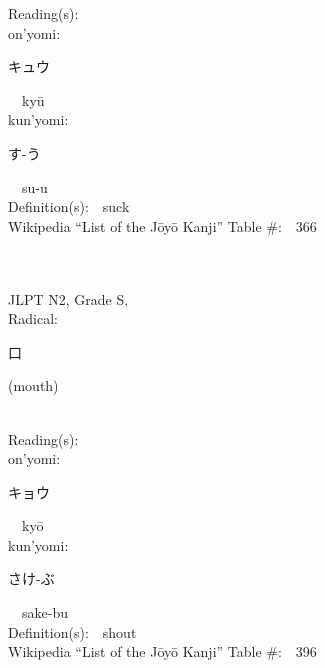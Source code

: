 \begin{multicols}{2}
Reading(s):\ \ \\
{\hspace*{1em}}on'yomi:\ \ \\
{\hspace*{2em}}{\begin{CJK}{UTF8}{min} キュウ \end{CJK}}\ \ ky\=u\ \ \\
{\hspace*{1em}}kun'yomi:\ \ \\
{\hspace*{2em}}{\begin{CJK}{UTF8}{min} す-う \end{CJK}}\ \ su-u\ \ \\
Definition(s):\ \ suck \\
Wikipedia ``List of the J\=oy\=o Kanji'' Table \#:\ \ 366 \\
\ \ \\
{\fontsize{34pt}{40pt}  }\ \ \\  %
{JLPT N2, Grade S, \\Radical:\ \ {\begin{CJK}{UTF8}{min} 口 \end{CJK}} (mouth) } \\
Reading(s):\ \ \\
{\hspace*{1em}}on'yomi:\ \ \\
{\hspace*{2em}}{\begin{CJK}{UTF8}{min} キョウ \end{CJK}}\ \ ky\=o\ \ \\
{\hspace*{1em}}kun'yomi:\ \ \\
{\hspace*{2em}}{\begin{CJK}{UTF8}{min} さけ-ぶ \end{CJK}}\ \ sake-bu\ \ \\
Definition(s):\ \ shout \\
Wikipedia ``List of the J\=oy\=o Kanji'' Table \#:\ \ 396 \\
\ \ \\
{\fontsize{34pt}{40pt}  }\ \ \\  %

\end{multicols}
